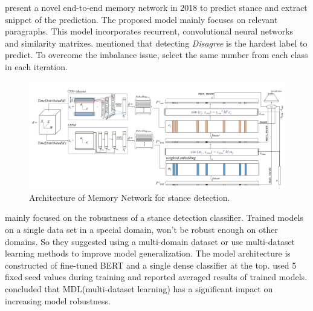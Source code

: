 	\cite{memory_network} present a novel end-to-end memory network in 2018 to predict stance and extract snippet of the prediction. The proposed model mainly focuses on relevant paragraphs. This model incorporates recurrent, convolutional neural networks and similarity matrixes. \cite{memory_network} mentioned that detecting \textit{Disagree} is the hardest label to predict. To overcome the imbalance issue, \cite{memory_network} select the same number from each class in each iteration. 
	\begin{figure}
		\centering
		\includegraphics[scale=0.25]{statistics/stance/memoty_network.png}
		\caption{Architecture of Memory Network for stance detection.}
		\label{fig:mem_network}
	\end{figure}

	\cite{stance_robust} mainly focused on the robustness of a stance detection classifier. Trained models  on a single data set in a special domain, won't be robust enough on other domains. So they suggested using a multi-domain dataset or use multi-dataset learning methods to improve model generalization. The model architecture is constructed of fine-tuned BERT\cite{bert} and a single dense classifier at the top. \cite{stance_robust} used 5 fixed seed values during training and reported averaged results of trained models. \cite{stance_robust} concluded that MDL(multi-dataset learning) has a significant impact on increasing model robustness.
	
